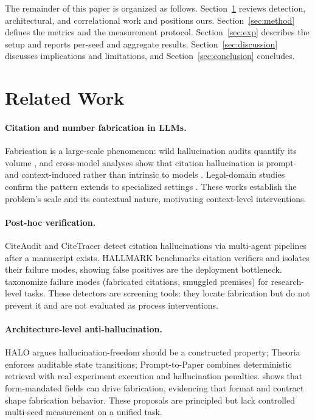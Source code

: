 \documentclass[10pt,twocolumn]{article}
\begin{document}
The remainder of this paper is organized as follows. Section~\ref{sec:related} reviews detection, architectural, and correlational work and positions ours. Section~\ref{sec:method} defines the metrics and the measurement protocol. Section~\ref{sec:exp} describes the setup and reports per-seed and aggregate results. Section~\ref{sec:discussion} discusses implications and limitations, and Section~\ref{sec:conclusion} concludes.

\section{Related Work}
\label{sec:related}

\paragraph{Citation and number fabrication in LLMs.}
Fabrication is a large-scale phenomenon: wild hallucination audits quantify its volume \citep{zhao2026wildhallucinations}, and cross-model analyses show that citation hallucination is prompt- and context-induced rather than intrinsic to models \citep{naser2026howllmscite}. Legal-domain studies confirm the pattern extends to specialized settings \citep{alrajeh2026legalcitations}. These works establish the problem's scale and its contextual nature, motivating context-level interventions.

\paragraph{Post-hoc verification.}
CiteAudit \citep{shi2026citeaudit} and CiteTracer \citep{li2026citetracer} detect citation hallucinations via multi-agent pipelines after a manuscript exists. HALLMARK \citep{reizinger2026hallmark} benchmarks citation verifiers and isolates their failure modes, showing false positives are the deployment bottleneck. \citet{banerjee2026failuremodes} taxonomize failure modes (fabricated citations, smuggled premises) for research-level tasks. These detectors are screening tools: they locate fabrication but do not prevent it and are not evaluated as process interventions.

\paragraph{Architecture-level anti-hallucination.}
HALO \citep{raduta2026halo} argues hallucination-freedom should be a constructed property; Theoria \citep{saldivar2026theoria} enforces auditable state transitions; Prompt-to-Paper \citep{kamran2026prompttopaper} combines deterministic retrieval with real experiment execution and hallucination penalties. \citet{usman2026phantomfill} shows that form-mandated fields can drive fabrication, evidencing that format and contract shape fabrication behavior. These proposals are principled but lack controlled multi-seed measurement on a unified task.
\end{document}
